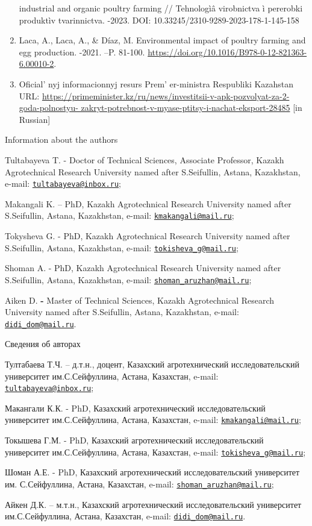 \begin{enumerate}
  industrial and organic poultry farming // Tehnologìâ virobnictva ì
  pererobki produktìv tvarinnictva. -2023. DOI:
  10.33245/2310-9289-2023-178-1-145-158
\item
  Laca, A., Laca, A., \& Díaz, M. Environmental impact of poultry
  farming and egg production. -2021. --P. 81-100.
  \url{https://doi.org/10.1016/B978-0-12-821363-6.00010-2}.
\item
  Oficial' nyj informacionnyj resurs
  Prem' er-ministra Respubliki Kazahstan URL:
  \href{https://primeminister.kz/ru/news/investitsii-v-apk-pozvolyat-za-2-goda-polnostyu-\%20zakryt-potrebnost-v-myase-ptitsy-i-nachat-eksport-28485}{https://primeminister.kz/ru/news/investitsii-v-apk-pozvolyat-za-2-goda-polnostyu-
  zakryt-potrebnost-v-myase-ptitsy-i-nachat-eksport-28485} {[}in
  Russian{]}
\end{enumerate}

Information about the authors

Tultabayeva T. - Doctor of Technical Sciences, Associate Professor,
Kazakh Agrotechnical Research University named after S.Seifullin,
Astana, Kazakhstan, e-mail:
\href{mailto:tultabayeva@inbox.ru}{\nolinkurl{tultabayeva@inbox.ru}};

Makangali K. -- PhD, Kazakh Agrotechnical Research University named
after S.Seifullin, Astana, Kazakhstan, e-mail:
\href{mailto:kmakangali@mail.ru}{\nolinkurl{kmakangali@mail.ru}};

Tokysheva G. - PhD, Kazakh Agrotechnical Research University named after
S.Seifullin, Astana, Kazakhstan, e-mail:
\href{mailto:tokisheva_g@mail.ru}{\nolinkurl{tokisheva\_g@mail.ru}};

Shoman A. - PhD, Kazakh Agrotechnical Research University named after
S.Seifullin, Astana, Kazakhstan, e-mail:
\href{mailto:shoman_aruzhan@mail.ru}{\nolinkurl{shoman\_aruzhan@mail.ru}};

Aiken D. {\bfseries -} Master of Technical Sciences, Kazakh Agrotechnical
Research University named after S.Seifullin, Astana, Kazakhstan, e-mail:
\href{mailto:didi_dom@mail.ru}{\nolinkurl{didi\_dom@mail.ru}}.

Сведения об авторах

Тултабаева Т.Ч. -- д.т.н., доцент, Казахский агротехнический
исследовательский университет им.С.Сейфуллина, Астана, Казахстан,
e-mail:
\href{mailto:tultabayeva@inbox.ru}{\nolinkurl{tultabayeva@inbox.ru}};

Макангали К.К. - PhD, Казахский агротехнический исследовательский
университет им.С.Сейфуллина, Астана, Казахстан, e-mail:
\href{mailto:kmakangali@mail.ru}{\nolinkurl{kmakangali@mail.ru}};

Токышева Г.М. - PhD, Казахский агротехнический исследовательский
университет им.С.Сейфуллина, Астана, Казахстан, e-mail:
\href{mailto:tokisheva_g@mail.ru}{\nolinkurl{tokisheva\_g@mail.ru}};

Шоман А.Е. - PhD, Казахский агротехнический исследовательский
университет им. С.Сейфуллина, Астана, Казахстан, e-mail:
\href{mailto:shoman_aruzhan@mail.ru}{\nolinkurl{shoman\_aruzhan@mail.ru}};

Айкен Д.К. -- м.т.н., Казахский агротехнический исследовательский
университет им.С.Сейфуллина, Астана, Казахстан, e-mail:
\href{mailto:didi_dom@mail.ru}{\nolinkurl{didi\_dom@mail.ru}}.